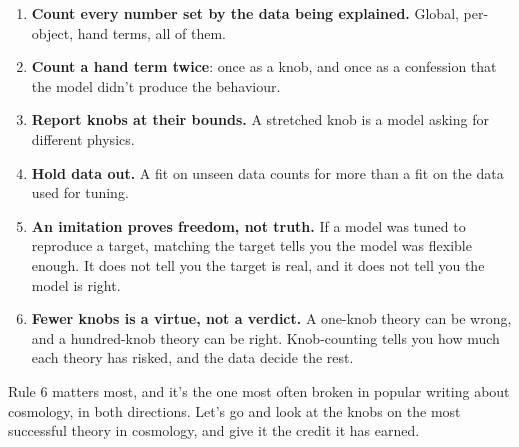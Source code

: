 \begin{enumerate}
\item \textbf{Count every number set by the data being explained.} Global, per-object, hand terms, all of them.
\item \textbf{Count a hand term twice}: once as a knob, and once as a confession that the model didn't produce the behaviour.
\item \textbf{Report knobs at their bounds.} A stretched knob is a model asking for different physics.
\item \textbf{Hold data out.} A fit on unseen data counts for more than a fit on the data used for tuning.
\item \textbf{An imitation proves freedom, not truth.} If a model was tuned to reproduce a target, matching the target tells you the model was flexible enough. It does not tell you the target is real, and it does not tell you the model is right.
\item \textbf{Fewer knobs is a virtue, not a verdict.} A one-knob theory can be wrong, and a hundred-knob theory can be right. Knob-counting tells you how much each theory has risked, and the data decide the rest.
\end{enumerate}

Rule 6 matters most, and it's the one most often broken in popular writing about cosmology, in both directions. Let's go and look at the knobs on the most successful theory in cosmology, and give it the credit it has earned.
